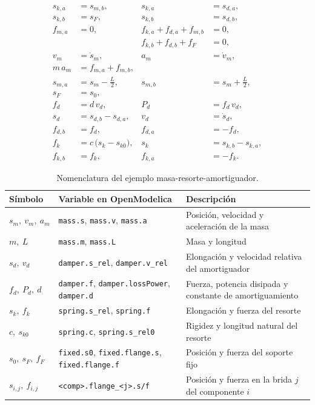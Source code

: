 \begin{subequations}
	\label{eq:example_flat}
	\begin{align}
		s_{k,a} &= s_{m,b}, & s_{k,a} &= s_{d,a}, \label{eq:flat_conn_first}\\
		s_{k,b} &= s_{F},   & s_{k,b} &= s_{d,b}, \\
		f_{m,a} &= 0, & f_{k,a} + f_{d,a} + f_{m,b} &= 0, \\
		& & f_{k,b} + f_{d,b} + f_{F} &= 0, \label{eq:flat_conn_last}\\[4pt]
		v_m &= \dot{s}_m, & a_m &= \dot{v}_m, \\
		m\, a_m &= f_{m,a} + f_{m,b}, & & \\
		s_{m,a} &= s_m - \tfrac{L}{2}, & s_{m,b} &= s_m + \tfrac{L}{2}, \\[4pt]
		s_F &= s_0, & & \\[4pt]
		f_d &= d\, v_d, & P_d &= f_d\, v_d, \\
		s_d &= s_{d,b} - s_{d,a}, & v_d &= \dot{s}_d, \\
		f_{d,b} &= f_d, & f_{d,a} &= -f_d, \\[4pt]
		f_k &= c\,\bigl(s_k - s_{k0}\bigr), & s_k &= s_{k,b} - s_{k,a}, \\
		f_{k,b} &= f_k, & f_{k,a} &= -f_k.
	\end{align}
\end{subequations}

\begin{table}[H]
	\centering
	\small
	\begin{tabularx}{\linewidth}{@{}l >{\raggedright\arraybackslash}X >{\raggedright\arraybackslash}X@{}}
		\hline
		Símbolo & Variable en OpenModelica & Descripción \\ \hline
		$s_m,\ v_m,\ a_m$ & \texttt{mass.s}, \texttt{mass.v}, \texttt{mass.a} & Posición, velocidad y aceleración de la masa \\
		$m,\ L$ & \texttt{mass.m}, \texttt{mass.L} & Masa y longitud \\
		$s_d,\ v_d$ & \texttt{damper.s\_rel}, \texttt{damper.v\_rel} & Elongación y velocidad relativa del amortiguador \\
		$f_d,\ P_d,\ d$ & \texttt{damper.f}, \texttt{damper.lossPower}, \texttt{damper.d} & Fuerza, potencia disipada y constante de amortiguamiento \\
		$s_k,\ f_k$ & \texttt{spring.s\_rel}, \texttt{spring.f} & Elongación y fuerza del resorte \\
		$c,\ s_{k0}$ & \texttt{spring.c}, \texttt{spring.s\_rel0} & Rigidez y longitud natural del resorte \\
		$s_0,\ s_F,\ f_F$ & \texttt{fixed.s0}, \texttt{fixed.flange.s}, \texttt{fixed.flange.f} & Posición y fuerza del soporte fijo \\
		$s_{i,j},\ f_{i,j}$ & \texttt{<comp>.flange\_<j>.s/f} & Posición y fuerza en la brida $j$ del componente $i$ \\ \hline
	\end{tabularx}
	\caption{Nomenclatura del ejemplo masa-resorte-amortiguador.}
	\label{tab:example_nomenclature}
\end{table}

